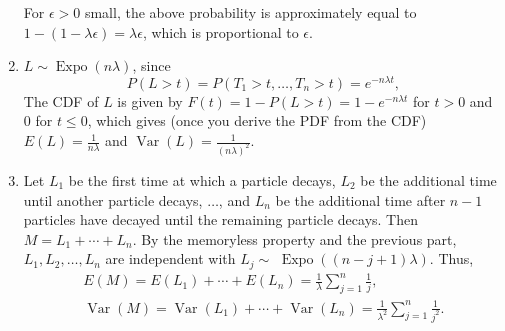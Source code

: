 \begin{exercise}[BH.5.37]
\begin{solution}
\begin{enumerate}
        For $\epsilon>0$ small, the above probability is approximately equal to $1-(1-\lambda \epsilon)=\lambda \epsilon$, which is proportional to $\epsilon$.
        \item  $L \sim \operatorname{Expo}(n \lambda)$, since
        $$
        P(L>t)=P\left(T_1>t, \ldots, T_n>t\right)=e^{-n \lambda t},
        $$
     The CDF of $L$ is given by $F(t)=1-P(L>t)=1-e^{-n \lambda t}$ for $t>0$ and 0 for $t \leq 0$, which gives (once you derive the PDF from the CDF) $E(L)=\frac{1}{n \lambda}$ and $\operatorname{Var}(L)=\frac{1}{(n \lambda)^2}$.
        \item Let $L_1$ be the first time at which a particle decays, $L_2$ be the additional time until another particle decays, $\ldots$, and $L_n$ be the additional time after $n-1$ particles have decayed until the remaining particle decays. Then $M=L_1+\cdots+L_n$. By the memoryless property and the previous part, $L_1, L_2, \ldots, L_n$ are independent with $L_j \sim$ $\operatorname{Expo}((n-j+1) \lambda)$. Thus,
        $$
        \begin{gathered}
            E(M)=E\left(L_1\right)+\cdots+E\left(L_n\right)=\frac{1}{\lambda} \sum_{j=1}^n \frac{1}{j}, \\
            \operatorname{Var}(M)=\operatorname{Var}\left(L_1\right)+\cdots+\operatorname{Var}\left(L_n\right)=\frac{1}{\lambda^2} \sum_{j=1}^n \frac{1}{j^2} .
        \end{gathered}
        $$
    \end{enumerate}
\end{solution}
\end{exercise}


